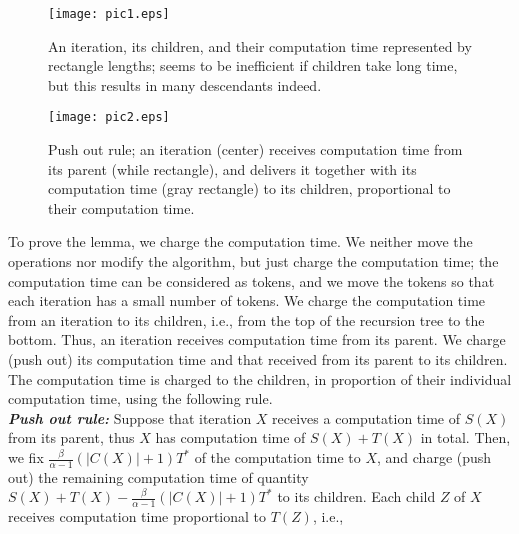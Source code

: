 \documentclass{llncs}
\begin{document}
\begin{figure}[t]
\begin{center}
\begin{minipage}{160pt}
\vspace{-4mm}
  \begin{center}
  \texttt{[image: pic1.eps]}
  \end{center}
\caption{An iteration, its children, and their computation time represented
    by rectangle lengths; seems to be inefficient if children take long time,
     but this results in many descendants indeed.
 }\label{fig:POcond}
\end{minipage}
\hspace{5mm}
\begin{minipage}{160pt}
\vspace{-4mm}
  \begin{center}
  \texttt{[image: pic2.eps]}
  \end{center}
\vspace{-4mm}
  \caption{Push out rule; an iteration (center) receives computation time 
  from its parent (while rectangle), and delivers it together with its
   computation time (gray rectangle) to its children, proportional to
    their computation time.
  }\label{fig:POrule}
\end{minipage}
\end{center}
\vspace{-4mm}
\end{figure}

\proof
To prove the lemma, we charge the computation time.
We neither move the operations nor modify the algorithm, but just
 charge the computation time; the computation time can be considered
 as tokens, and we move the tokens so that each iteration has a small
 number of tokens.
We charge the computation time from an iteration to its children, i.e.,
 from the top of the recursion tree to the bottom.
Thus, an iteration receives computation time from its parent.
We charge (push out) its computation time and that received from its parent 
 to its children.
The computation time is charged to the children, in proportion of their
 individual computation time, using the following rule.\\

\vspace{-1mm}
\noindent
{\bf \em Push out rule:}
Suppose that iteration $X$ receives a computation time of $S(X)$ from
 its parent, thus $X$ has computation time of $S(X) + T(X)$ in total.
Then, we fix $\frac{\beta}{\alpha-1}(|C(X)|+1) T^*$ of the computation
 time to $X$, and charge (push out) the remaining computation time of quantity
 $S(X) + T(X) - \frac{\beta}{\alpha-1}(|C(X)|+1) T^*$ to its children.
Each child $Z$ of $X$ receives computation time proportional to $T(Z)$,
 i.e., 
\end{document}
